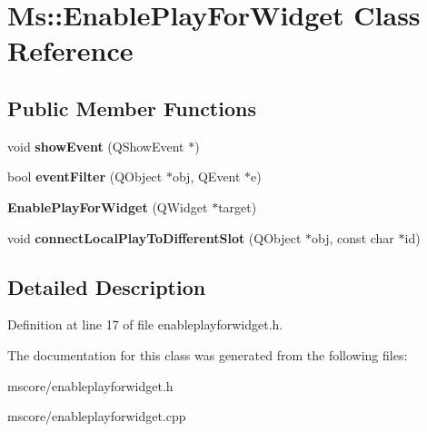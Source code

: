 \hypertarget{class_ms_1_1_enable_play_for_widget}{}\section{Ms\+:\+:Enable\+Play\+For\+Widget Class Reference}
\label{class_ms_1_1_enable_play_for_widget}
\subsection*{Public Member Functions}
\begin{DoxyCompactItemize}
\item 
\mbox{\label{class_ms_1_1_enable_play_for_widget_a44dcf906a6cd468935ad239b4fad79e6}} 
void {\bfseries show\+Event} (Q\+Show\+Event $\ast$)
\item 
\mbox{\label{class_ms_1_1_enable_play_for_widget_adcc4734ce5b5c94ffc953d585289eb31}} 
bool {\bfseries event\+Filter} (Q\+Object $\ast$obj, Q\+Event $\ast$e)
\item 
\mbox{\label{class_ms_1_1_enable_play_for_widget_aec9030c387f053afd639080a6d990080}} 
{\bfseries Enable\+Play\+For\+Widget} (Q\+Widget $\ast$target)
\item 
\mbox{\label{class_ms_1_1_enable_play_for_widget_a9f129d406e38cd3d6ad1bfb6a41ef1a4}} 
void {\bfseries connect\+Local\+Play\+To\+Different\+Slot} (Q\+Object $\ast$obj, const char $\ast$id)
\end{DoxyCompactItemize}


\subsection{Detailed Description}


Definition at line 17 of file enableplayforwidget.\+h.



The documentation for this class was generated from the following files\+:\begin{DoxyCompactItemize}
\item 
mscore/enableplayforwidget.\+h\item 
mscore/enableplayforwidget.\+cpp\end{DoxyCompactItemize}
